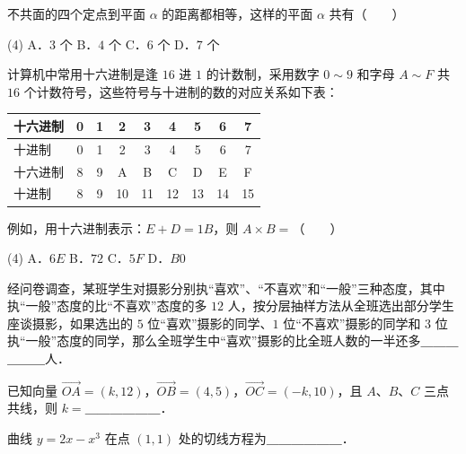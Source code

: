 \begin{question}
不共面的四个定点到平面 $\alpha$ 的距离都相等，这样的平面 $\alpha$ 共有\mbox{（　　）}

\begin{gkopts}(4)
\task A．$3$ 个
\task B．$4$ 个
\task C．$6$ 个
\task D．$7$ 个
\end{gkopts}

\end{question}
\begin{question}
计算机中常用十六进制是逢 $16$ 进 $1$ 的计数制，采用数字 $0 \sim 9$ 和字母 $A \sim F$ 共 $16$ 个计数符号，这些符号与十进制的数的对应关系如下表：

\begin{center}
\begingroup\setlength{\tabcolsep}{4pt}
\begin{tabular}{lcccccccc}
\toprule
十六进制 & 0 & 1 & 2 & 3 & 4 & 5 & 6 & 7 \\
\midrule
十进制 & 0 & 1 & 2 & 3 & 4 & 5 & 6 & 7 \\
十六进制 & 8 & 9 & A & B & C & D & E & F \\
十进制 & 8 & 9 & 10 & 11 & 12 & 13 & 14 & 15 \\
\bottomrule
\end{tabular}
\endgroup
\end{center}

例如，用十六进制表示：$E + D = 1B$，则 $A \times B =$\mbox{（　　）}

\begin{gkopts}(4)
\task A．$6E$
\task B．$72$
\task C．$5F$
\task D．$B0$
\end{gkopts}

\end{question}
\begin{question}
经问卷调查，某班学生对摄影分别执“喜欢”、“不喜欢”和“一般”三种态度，其中执“一般”态度的比“不喜欢”态度的多 $12$ 人，按分层抽样方法从全班选出部分学生座谈摄影，如果选出的 $5$ 位“喜欢”摄影的同学、$1$ 位“不喜欢”摄影的同学和 $3$ 位执“一般”态度的同学，那么全班学生中“喜欢”摄影的比全班人数的一半还多＿＿＿＿＿＿人．

\end{question}
\begin{question}
已知向量 $\overrightarrow{OA} = (k, 12)$，$\overrightarrow{OB} = (4, 5)$，$\overrightarrow{OC} = (-k, 10)$，且 $A$、$B$、$C$ 三点共线，则 $k =$＿＿＿＿＿＿．

\end{question}
\begin{question}
曲线 $y = 2x - x^3$ 在点 $(1, 1)$ 处的切线方程为＿＿＿＿＿＿．

\end{question}
